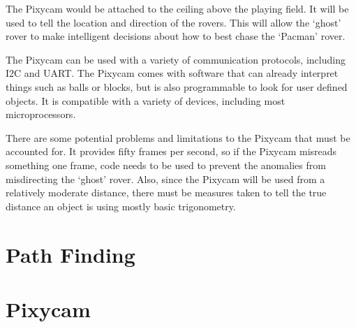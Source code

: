 \documentclass[12pt,letterpaper]{article}
\begin{document}
The Pixycam would be attached to the ceiling above the playing field. It will be used to tell the location and direction of the rovers. This will allow the ‘ghost’ rover to make intelligent decisions about how to best chase the ‘Pacman’ rover. 

The Pixycam can be used with a variety of communication protocols, including I2C and UART. The Pixycam comes with software that can already interpret things such as balls or blocks, but is also programmable to look for user defined objects. It is compatible with a variety of devices, including most microprocessors. 

There are some potential problems and limitations to the Pixycam that must be accounted for. It provides fifty frames per second, so if the Pixycam misreads something one frame, code needs to be used to prevent the anomalies from misdirecting the ‘ghost’ rover. Also, since the Pixycam will be used from a relatively moderate distance, there must be measures taken to tell the true distance an object is using mostly basic trigonometry. 




\section{Path Finding}

\section{Pixycam}
\end{document}
